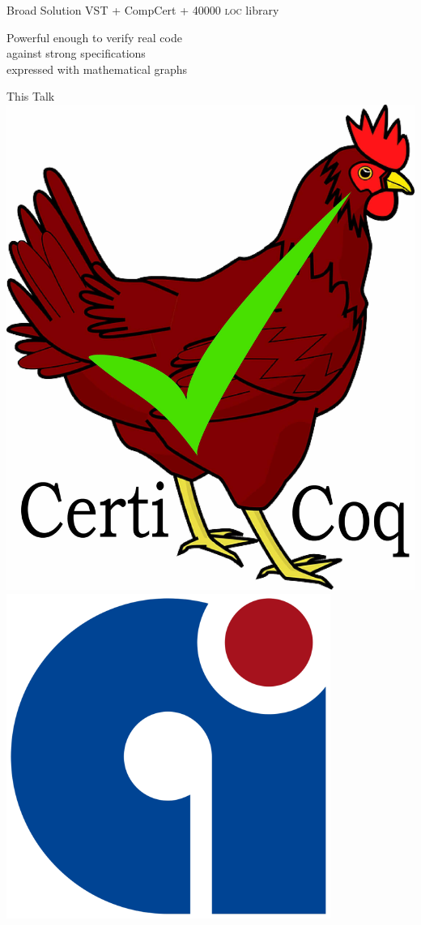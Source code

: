 \documentclass[usenames, xcolor=dvipsnames]{beamer}
\begin{document}
\begin{frame}{Broad Solution}
\bigskip
\alert{VST} + \alert{CompCert} + \alert{40000 \textsc{loc} library}

\pause
\bigskip
Powerful enough to verify real code 
\\\hspace{1em}against strong specifications 
\\\hspace{2em}expressed with mathematical graphs

\pause 
\bigskip
{}
\end{frame}

\begin{frame}{This Talk}
\includegraphics[scale=0.02]{certicoq_logo} 
\hspace{2em} \includegraphics[scale=0.12]{compcert_logo}


\end{frame}
\end{document}
